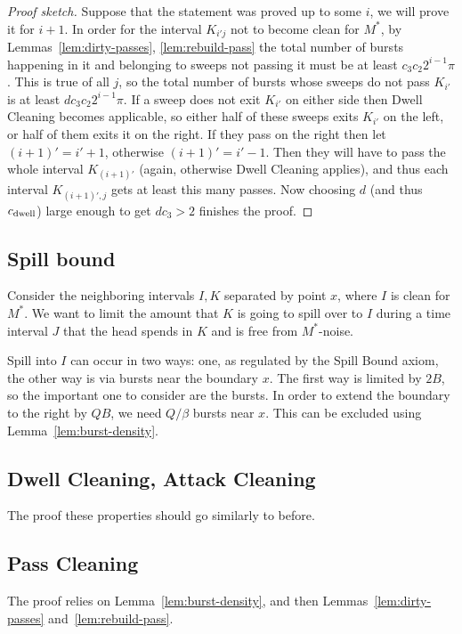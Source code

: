 \documentclass[12pt]{memoir}
\def\B{B}
\newcommand{\Q}{Q}
\newcommand{\Cns}[2]{#1_{\textrm{\upshape #2}}}
\newcommand{\cns}[1]{\Cns{c}{#1}}
\newcommand{\cDwell}{\cns{dwell}}
\begin{document}
\begin{proof}[Proof sketch]
Suppose that the statement was proved up to some \( i \), we will prove it for \( i+1 \).
In order for the interval \( K_{i'j} \) not to become clean for \( M^{*} \), 
by Lemmas~\ref{lem:dirty-passes}, \ref{lem:rebuild-pass}
the total number of bursts happening in it and belonging to sweeps not 
passing it must be at least \( c_{3}c_{2} 2^{i-1}\pi \).
This is true of all \( j \), so the total number of bursts whose sweeps do not pass \( K_{i'} \)
is at least \( d c_{3}c_{2} 2^{i-1}\pi \).
If a sweep does not exit \( K_{i'} \) on either side then Dwell Cleaning becomes applicable,
so either half of these sweeps exits \( K_{i'} \) on the left, or half of them exits it on the right.
If they pass on the right then let \( (i+1)'=i'+1 \), otherwise \( (i+1)'=i'-1 \).
Then they will have to pass the whole interval \( K_{(i+1)'} \) (again, otherwise Dwell Cleaning
applies), and thus each interval \( K_{(i+1)',j} \) gets at least this many passes.
Now choosing \( d \) (and thus \( \cDwell \)) large enough 
to get \( d c_{3}>2 \) finishes the proof.
\end{proof}


\subsection{Spill bound}

Consider the neighboring intervals \( I,K \) separated by point \( x \),
where \( I \) is clean for \( M^{*} \).
We want to limit the amount that \( K \) is going to spill over to \( I \) during a time
interval \( J \) that the head spends in \( K \) and is free from \( M^{*} \)-noise.

Spill into \( I \) can occur in two ways: one, as regulated by the Spill Bound axiom, the other way is via bursts near the boundary \( x \).
The first way is limited by \( 2\B \), so the important one to consider are the bursts.
In order to extend the boundary to the right by \( \Q\B \),
we need \( \Q/\beta \) bursts near \( x \).
This can be excluded using Lemma~\ref{lem:burst-density}.

\subsection{Dwell Cleaning, Attack Cleaning}

The proof these properties should go similarly to before.

\subsection{Pass Cleaning}

The proof relies on Lemma~\ref{lem:burst-density}, and then 
Lemmas~\ref{lem:dirty-passes} and~\ref{lem:rebuild-pass}.
\end{document}
